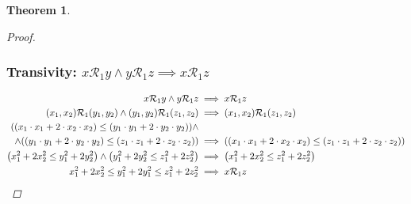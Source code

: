 \documentclass[]{article}
\newcommand{\Rel}{\mathcal{R}}
\newtheorem{theorem}{Theorem}
\begin{document}
\begin{theorem}
\begin{proof}
        \subsubsection{Transivity: $x \Rel_1 y \land y \Rel_1 z \implies x \Rel_1 z$}
        \begin{align*}
            x \Rel_1 y \land y \Rel_1 z 
                &\implies x \Rel_1 z\\
            (x_1,x_2) \Rel_1 (y_1,y_2) \land (y_1,y_2) \Rel_1 (z_1,z_2)
                &\implies (x_1,x_2) \Rel_1 (z_1,z_2)\\
            \qty((x_1 \cdot x_1 + 2 \cdot x_2 \cdot x_2)
                    \leq (y_1 \cdot y_1 + 2 \cdot y_2 \cdot y_2)) 
                \land&\\
                \land \qty((y_1 \cdot y_1 + 2 \cdot y_2 \cdot y_2)
                    \leq (z_1 \cdot z_1 + 2 \cdot z_2 \cdot z_2)) 
                &\implies \qty((x_1 \cdot x_1 + 2 \cdot x_2 \cdot x_2)
                    \leq (z_1 \cdot z_1 + 2 \cdot z_2 \cdot z_2))\\
            \qty(x_1^2 + 2 x_2^2 \leq y_1^2 + 2 y_2^2)
                    \land \qty(y_1^2 + 2 y_2^2 \leq z_1^2 + 2 z_2^2)
                &\implies \qty(x_1^2 + 2 x_2^2 \leq z_1^2 + 2 z_2^2)\\
            x_1^2 + 2 x_2^2 \leq y_1^2 + 2 y_1^2 \leq z_1^2 + 2 z_2^2
                &\implies x \Rel_1 z
        \end{align*}
    \end{proof}
\end{theorem}
\end{document}

